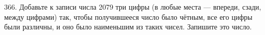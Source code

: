 366. Добавьте к записи числа 2079 три цифры (в любые места --- впереди, сзади, между цифрами) так, чтобы получившееся число было чётным, все его цифры были различны, и оно было наименьшим из таких чисел. Запишите это число.\\
